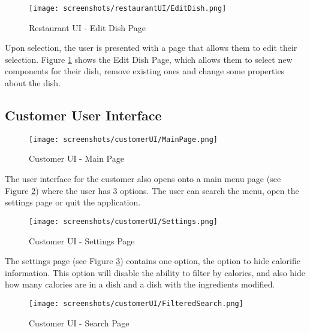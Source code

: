 \begin{figure}[h]
    \centering
    \captionsetup{justification=centering}
    \texttt{[image: screenshots/restaurantUI/EditDish.png]}
    \caption{Restaurant UI - Edit Dish Page}
    \label{fig:restaurantUI_edit_dish}
\end{figure}

Upon selection, the user is presented with a page that allows them to edit their selection. Figure \ref{fig:restaurantUI_edit_dish} shows the Edit Dish Page, which allows them to select new components for their dish, remove existing ones and change some properties about the dish.

\subsection{Customer User Interface}

\begin{figure}[h]
    \centering
    \captionsetup{justification=centering}
    \texttt{[image: screenshots/customerUI/MainPage.png]}
    \caption{Customer UI - Main Page}
    \label{fig:customerUI_main}
\end{figure}

The user interface for the customer also opens onto a main menu page (see Figure \ref{fig:customerUI_main}) where the user has 3 options. The user can search the menu, open the settings page or quit the application.

\begin{figure}[h]
    \centering
    \captionsetup{justification=centering}
    \texttt{[image: screenshots/customerUI/Settings.png]}
    \caption{Customer UI - Settings Page}
    \label{fig:customerUI_settings}
\end{figure}

The settings page (see Figure \ref{fig:customerUI_settings}) contains one option, the option to hide calorific information. This option will disable the ability to filter by calories, and also hide how many calories are in a dish and a dish with the ingredients modified.

\begin{figure}[h]
    \centering
    \captionsetup{justification=centering}
    \texttt{[image: screenshots/customerUI/FilteredSearch.png]}
    \caption{Customer UI - Search Page}
    \label{fig:customerUI_search}
\end{figure}

